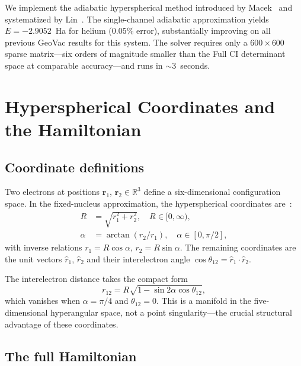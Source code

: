 \documentclass[aps,pra,twocolumn,superscriptaddress,longbibliography]{revtex4-2}
\begin{document}
We implement the adiabatic hyperspherical method introduced by
Macek~\cite{Macek1968} and systematized by
Lin~\cite{Lin1995}.  The single-channel adiabatic approximation
yields $E = -2.9052$~Ha for helium (0.05\% error), substantially
improving on all previous GeoVac results for this system.  The
solver requires only a $600 \times 600$ sparse matrix---six orders
of magnitude smaller than the Full CI determinant space at comparable
accuracy---and runs in $\sim$3~seconds.


\section{Hyperspherical Coordinates and the Hamiltonian}
\label{sec:coordinates}

\subsection{Coordinate definitions}

Two electrons at positions $\bm{r}_1$, $\bm{r}_2 \in \mathbb{R}^3$
define a six-dimensional configuration space.  In the fixed-nucleus
approximation, the hyperspherical coordinates
are~\cite{Macek1968, Lin1995}:
\begin{align}
  R &= \sqrt{r_1^2 + r_2^2}, \quad R \in [0, \infty),
    \label{eq:R_def} \\
  \alpha &= \arctan(r_2/r_1), \quad \alpha \in [0, \pi/2],
    \label{eq:alpha_def}
\end{align}
with inverse relations $r_1 = R\cos\alpha$, $r_2 = R\sin\alpha$.
The remaining coordinates are the unit vectors $\hat{r}_1$,
$\hat{r}_2$ and their interelectron angle
$\cos\theta_{12} = \hat{r}_1 \cdot \hat{r}_2$.

The interelectron distance takes the compact form
\begin{equation}
  r_{12} = R\sqrt{1 - \sin 2\alpha\cos\theta_{12}},
  \label{eq:r12}
\end{equation}
which vanishes when $\alpha = \pi/4$ and $\theta_{12} = 0$.  This is
a manifold in the five-dimensional hyperangular space, not a point
singularity---the crucial structural advantage of these coordinates.

\subsection{The full Hamiltonian}
\end{document}
